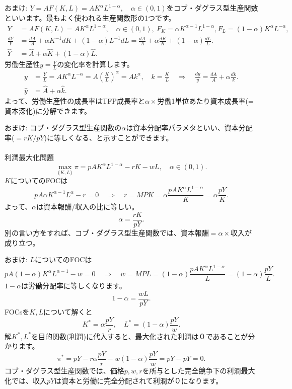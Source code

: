 \begin{frame}[t]{}
おまけ: $Y=AF(K, L)=AK^{\alpha}L^{1-\alpha}, \quad \alpha\in(0, 1)$をコブ・ダグラス型生産関数といいます。最もよく使われる生産関数形の1つです。
\[
\begin{aligned}
Y
&=
AF(K, L)=AK^{\alpha}L^{1-\alpha}, \quad \alpha\in(0, 1), \ F_{K}=\alpha K^{\alpha-1}L^{1-\alpha}, F_{L}=(1-\alpha)K^{\alpha}L^{-\alpha},\\
\frac{dY}{Y}
&=
\frac{dA}{A}+\alpha K^{-1}dK+(1-\alpha)L^{-1}dL=
\frac{dA}{A}+\alpha\frac{dK}{K}+(1-\alpha)\frac{dL}{L}.\\
\hat{Y}
&=
\hat{A}+\alpha\hat{K}+(1-\alpha)\hat{L}.
\end{aligned}
\]
労働生産性$y=\frac{Y}{L}$の変化率を計算します。
\[
\begin{aligned}
y
&=
\frac{Y}{L}
=
AK^{\alpha}L^{-\alpha}=A\left(\frac{K}{L}\right)^{\alpha}=Ak^{\alpha}, \quad k=\frac{K}{L}\quad\Rightarrow\quad
\frac{dy}{y}
=
\frac{dA}{A}+\alpha\frac{dk}{k}.\\
\hat{y}
&=
\hat{A}+\alpha\hat{k}.
\end{aligned}
\]
よって、労働生産性の成長率はTFP成長率と$\alpha\times$労働1単位あたり資本成長率(=資本深化)に分解できます。
\end{frame}

\begin{frame}[t]{}
おまけ: コブ・ダグラス型生産関数の$\alpha$は資本分配率パラメタといい、資本分配率($=rK/pY$)に等しくなる、と示すことができます。\\~\\
利潤最大化問題
\[
\max_{\{K, L\}}\pi=pAK^{\alpha}L^{1-\alpha}-rK-wL, \quad \alpha\in(0, 1).
\]
$K$についてのFOCは
\[
pA\alpha K^{\alpha-1}L^{\alpha}-r=0 \quad \Rightarrow \quad r=MPK=\alpha \frac{pAK^{\alpha}L^{1-\alpha}}{K}=\alpha \frac{pY}{K}.
\]
よって、$\alpha$は資本報酬/収入の比に等しい。
\[
\alpha=\frac{rK}{pY}.
\]
別の言い方をすれば、コブ・ダグラス型生産関数では、資本報酬$=\alpha\times$収入が成り立つ。
\end{frame}

\begin{frame}[t]{}
おまけ: $L$についてのFOCは
\[
pA(1-\alpha) K^{\alpha}L^{\alpha-1}-w=0 \quad \Rightarrow \quad w=MPL=(1-\alpha) \frac{pAK^{\alpha}L^{1-\alpha}}{L}=(1-\alpha) \frac{pY}{L}.
\]
$1-\alpha$は労働分配率に等しくなります。
\[
1-\alpha=\frac{wL}{pY}.
\]
FOCsを$K, L$について解くと
\[
K^{*}=\alpha \frac{pY}{r}, \quad L^{*}=(1-\alpha)\frac{pY}{w}.
\]
解$K^{*}, L^{*}$を目的関数(利潤)に代入すると、最大化された利潤は０であることが分かります。
\[
\pi^{*}=pY-r\alpha \frac{pY}{r}-w(1-\alpha)\frac{pY}{w}=pY-pY=0.
\]
コブ・ダグラス型生産関数では、価格$p, w, r$を所与とした完全競争下の利潤最大化では、収入$pY$は資本と労働に完全分配されて利潤が０になります。
\end{frame}


